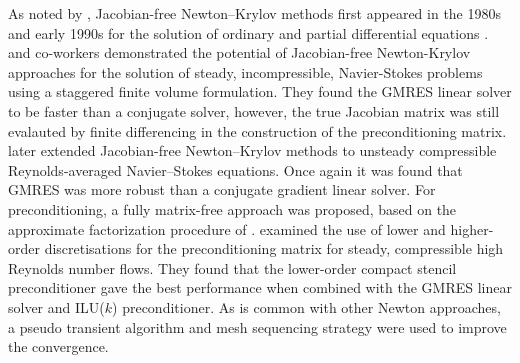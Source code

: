 \documentclass[sn-mathphys,Numbered]{sn-jnl}%
\begin{document}
As noted by \citet{Knoll2004}, Jacobian-free Newton–Krylov methods first appeared in the 1980s and early 1990s for the solution of ordinary and partial differential equations \citep{Gear1983, Chan1984, Brown1986, Brown1990}.
\citet{Mchugh1994} and co-workers demonstrated the potential of Jacobian-free Newton-Krylov approaches for the solution of steady, incompressible, Navier-Stokes problems using a staggered finite volume formulation.
They found the GMRES linear solver to be faster than a conjugate solver, however, the true Jacobian matrix was still evalauted by finite differencing in the construction of the preconditioning matrix.
\citet{Qin2000} later extended Jacobian-free Newton–Krylov methods to unsteady compressible Reynolds-averaged Navier–Stokes equations.
Once again it was found that GMRES was more robust than a conjugate gradient linear solver.
For preconditioning, a fully matrix-free approach was proposed, based on the approximate factorization procedure of \citet{Badcock1996}.
\citet{Geuzaine2001} examined the use of lower and higher-order discretisations for the preconditioning matrix for steady, compressible high Reynolds number flows.
They found that the lower-order compact stencil preconditioner gave the best performance when combined with the GMRES linear solver and ILU($k$) preconditioner.
As is common with other Newton approaches, a pseudo transient algorithm and mesh sequencing strategy were used to improve the convergence.
\end{document}
